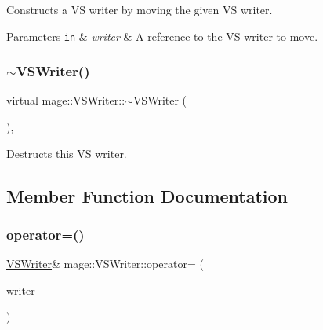 Constructs a VS writer by moving the given VS writer.


\begin{DoxyParams}[1]{Parameters}
\mbox{\tt in}  & {\em writer} & A reference to the VS writer to move. \\
\hline
\end{DoxyParams}
\hypertarget{classmage_1_1_v_s_writer_ac2268dde1a58f0d1d657e584e33e82fe}{}\label{classmage_1_1_v_s_writer_ac2268dde1a58f0d1d657e584e33e82fe} 
\subsubsection{\texorpdfstring{$\sim$\+V\+S\+Writer()}{~VSWriter()}}
{\footnotesize\ttfamily virtual mage\+::\+V\+S\+Writer\+::$\sim$\+V\+S\+Writer (\begin{DoxyParamCaption}{ }\end{DoxyParamCaption})\hspace{0.3cm}{\ttfamily [virtual]}, {\ttfamily [default]}}

Destructs this VS writer. 

\subsection{Member Function Documentation}
\hypertarget{classmage_1_1_v_s_writer_af943d317ae357723a08b2bbf2bab23ba}{}\label{classmage_1_1_v_s_writer_af943d317ae357723a08b2bbf2bab23ba} 
\subsubsection{\texorpdfstring{operator=()}{operator=()}\hspace{0.1cm}{\footnotesize\ttfamily [1/2]}}
{\footnotesize\ttfamily \hyperlink{classmage_1_1_v_s_writer}{V\+S\+Writer}\& mage\+::\+V\+S\+Writer\+::operator= (\begin{DoxyParamCaption}\item[{const \hyperlink{classmage_1_1_v_s_writer}{V\+S\+Writer} \&}]{writer }\end{DoxyParamCaption})\hspace{0.3cm}{\ttfamily [delete]}}

